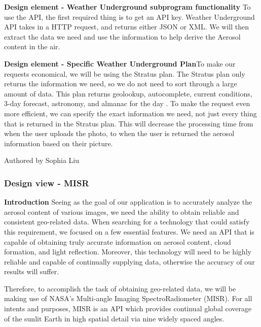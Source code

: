 \documentclass[onecolumn, draftclsnofoot,10pt, compsoc]{IEEEtran}
\begin{document}
\begin{flushleft}
\medskip

\textbf{Design element - Weather Underground subprogram functionality} To use the API, the first required thing is to get an API key. Weather Underground API takes in a HTTP request, and returns either JSON or XML. We will then extract the data we need and use the information to help derive the Aerosol content in the air. \cite{3}

\medskip

\textbf{Design element - Specific Weather Underground Plan}To make our requests economical, we will be using the Stratus plan.  The Stratus plan only returns the information we need, so we do not need to sort through a large amount of data. This plan returns geolookup, autocomplete, current conditions, 3-day forecast, astronomy, and almanac for the day \cite{3}. To make the request even more efficient, we can specify the exact information we need, not just every thing that is returned in the Stratus plan. This will decrease the processing time from when the user uploads the photo, to when the user is returned the aerosol information based on their picture.

\smallskip

\footnotesize Authored by Sophia Liu
\normalsize

\bigskip

\subsubsection{Design view - MISR}

\textbf{Introduction} Seeing as the goal of our application is to accurately analyze the aerosol content of various images, we need the ability to obtain reliable and consistent geo-related data.
When searching for a technology that could satisfy this requirement, we focused on a few essential features. We need an API that is capable of obtaining truly accurate information on aerosol content, cloud formation, and light reflection. Moreover, this technology will need to be highly reliable and capable of continually supplying data, otherwise the accuracy of our results will suffer. 

\medskip

Therefore, to accomplish the task of obtaining geo-related data, we will be making use of NASA’s Multi-angle Imaging SpectroRadiometer (MISR). For all intents and purposes, MISR is an API which provides continual global coverage of the sunlit Earth in high spatial detail via nine widely spaced angles. \cite{2}


\end{flushleft}
\end{document}

